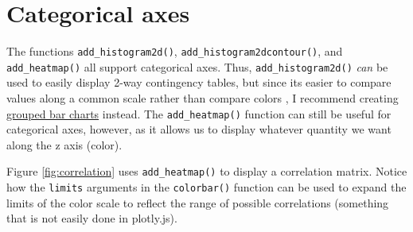 \documentclass[
  12pt,
]{krantz}
\newenvironment{Shaded}{\begin{snugshade}}{\end{snugshade}}
\newcommand{\DataTypeTok}[1]{\textcolor[rgb]{0.13,0.29,0.53}{#1}}
\newcommand{\DecValTok}[1]{\textcolor[rgb]{0.00,0.00,0.81}{#1}}
\newcommand{\KeywordTok}[1]{\textcolor[rgb]{0.13,0.29,0.53}{\textbf{#1}}}
\newcommand{\NormalTok}[1]{#1}
\newcommand{\OperatorTok}[1]{\textcolor[rgb]{0.81,0.36,0.00}{\textbf{#1}}}
\newcommand{\StringTok}[1]{\textcolor[rgb]{0.31,0.60,0.02}{#1}}
\begin{document}
\hypertarget{categorical-axes}{%
\section{Categorical axes}\label{categorical-axes}}

The functions \texttt{add\_histogram2d()}, \texttt{add\_histogram2dcontour()}, and \texttt{add\_heatmap()} all support categorical axes. Thus, \texttt{add\_histogram2d()} \emph{can} be used to easily display 2-way contingency tables, but since its easier to compare values along a common scale rather than compare colors \citep{graphical-perception}, I recommend creating \protect\hyperlink{multiple-discrete-distributions}{grouped bar charts} instead. The \texttt{add\_heatmap()} function can still be useful for categorical axes, however, as it allows us to display whatever quantity we want along the z axis (color).

Figure \ref{fig:correlation} uses \texttt{add\_heatmap()} to display a correlation matrix. Notice how the \texttt{limits} arguments in the \texttt{colorbar()} function can be used to expand the limits of the color scale to reflect the range of possible correlations (something that is not easily done in plotly.js).

\begin{Shaded}
\end{Shaded}
\end{document}
